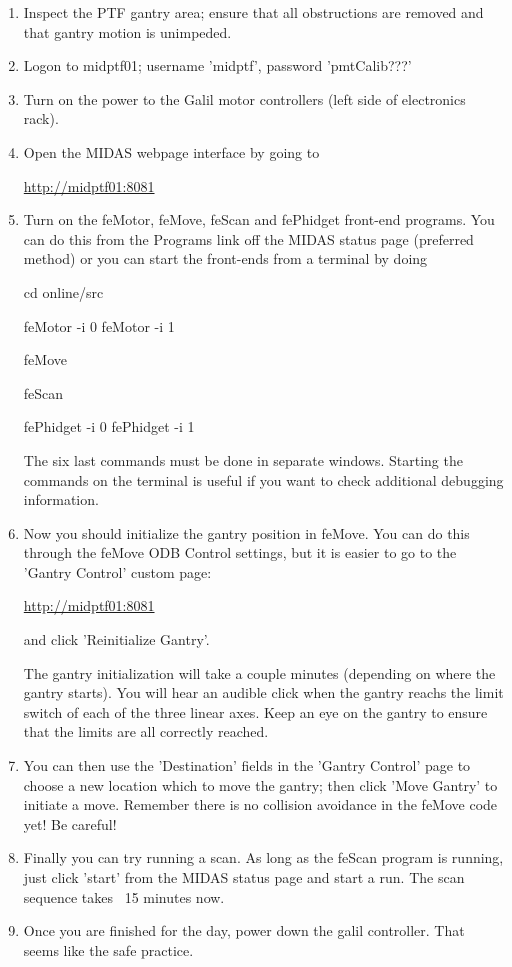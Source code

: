 \documentclass[a4paper,12pt]{article}
\begin{document}
\begin{enumerate}
\item Inspect the PTF gantry area; ensure that all obstructions are removed
and that gantry motion is unimpeded.

\item Logon to midptf01; username 'midptf', password 'pmtCalib???'

\item Turn on the power to the Galil motor controllers (left side of electronics rack).

\item Open the MIDAS webpage interface by going to 

\url{http://midptf01:8081}

\item Turn on the feMotor, feMove, feScan and fePhidget front-end programs.  You can 
do this from the Programs link off the MIDAS status page (preferred method)
or you can start the front-ends from a terminal by doing

cd online/src

feMotor -i 0
feMotor -i 1

feMove

feScan

fePhidget -i 0 
fePhidget -i 1

The six last commands must be done in separate windows.  Starting the commands on the terminal 
is useful if you want to check additional debugging information.

\item Now you should initialize the gantry position in feMove.  You can do this through the feMove
ODB Control settings, but it is easier to go to the 'Gantry Control' custom page:

\url{http://midptf01:8081}

and click 'Reinitialize Gantry'.

The gantry initialization will take a couple minutes (depending on where the gantry starts).  You will
hear an audible click when the gantry reachs the limit switch of each of the three linear axes.  Keep an
eye on the gantry to ensure that the limits are all correctly reached.

\item You can then use the 'Destination' fields in the 'Gantry Control' page to choose a new location which
to move the gantry; then click 'Move Gantry' to initiate a move.  Remember there is no collision avoidance in the
feMove code yet!  Be careful!

\item Finally you can try running a scan.  As long as the feScan program is running, just 
click 'start' from the MIDAS status page and start a run.  The scan sequence takes ~15 minutes now.

\item Once you are finished for the day, power down the galil controller.  That seems like the safe practice.



\end{enumerate}
\end{document}
